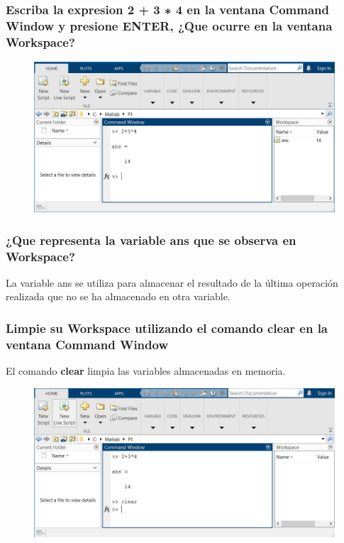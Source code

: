 \documentclass{article}
\begin{document}
\subsubsection{Escriba la expresion 2 + 3 ∗ 4 en la ventana Command Window y presione ENTER, ¿Que ocurre en la ventana Workspace?}

\begin{figure}[H]
    \centering
    \includegraphics[width=18cm]{img2.jpg}
\end{figure}

\subsubsection{¿Que representa la variable ans que se observa en Workspace?}

La variable ans se utiliza para almacenar el resultado de la última operación realizada que no se ha almacenado en otra variable.

\subsubsection{Limpie su Workspace utilizando el comando clear en la ventana Command Window}

El comando \textbf{clear} limpia las variables almacenadas en memoria.

\begin{figure}[H]
    \centering
    \includegraphics[width=18cm]{img3.jpg}
\end{figure}
\end{document}

